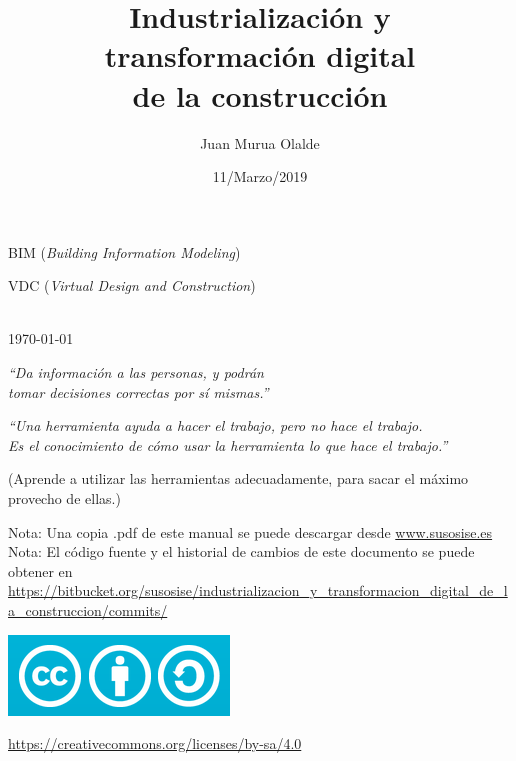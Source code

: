 \documentclass[spanish,12pt,a4paper,final,oneside]{book}
\title{Industrialización y \\ transformación digital \\ de la construcción}
\author{Juan Murua Olalde}
\date{11/Marzo/2019}
\begin{document}
\begin{titlepage}

\begin{flushright}
\vspace{2cm}
\begin{Huge}\MyTitle\end{Huge}

\vspace{0.3cm}
{\large BIM (\textit{Building Information Modeling})}

{\large VDC (\textit{Virtual Design and Construction})}

\vspace{1cm}
\MyAuthor

\vspace{1cm}
\MyDate
\\ \today
\\\end{flushright}

\begin{flushleft}
\vspace{3cm}

\textit{``Da información a las personas, y podrán \\tomar decisiones correctas por sí mismas.''}

\vspace{1.5cm}
\textit{``Una herramienta ayuda a hacer el trabajo, pero no hace el trabajo.\\ Es el conocimiento de cómo usar la herramienta lo que hace el trabajo.''}

\begin{footnotesize}(Aprende a utilizar las herramientas adecuadamente, para sacar el máximo provecho de ellas.)\end{footnotesize}

\end{flushleft}

\vfill
\begin{small}
Nota: Una copia .pdf de este manual se puede descargar desde \url{www.susosise.es}
\\Nota: El código fuente y el historial de cambios de este documento se puede obtener en \\ \url{https://bitbucket.org/susosise/industrializacion_y_transformacion_digital_de_la_construccion/commits/}
\end{small}
\begin{flushleft}
\includegraphics[scale=0.3]{CreativeCommons-Attribution-ShareAlike-logo}
\begin{small}\url{https://creativecommons.org/licenses/by-sa/4.0}\end{small}
\end{flushleft}

\end{titlepage}
\end{document}
